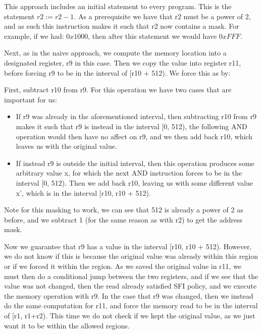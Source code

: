 This approach includes an initial statement to every program. This is the
statement $r2 := r2 - 1$. As a prerequisite we have that r2 must be a power of
2, and as such this instruction makes it such that r2 now contains a mask. For
example, if we had: $0x1000$, then after this statement we would have $0xFFF$.

Next, as in the naive approach, we compute the memory location into a
designated register, r9 in this case. Then we copy the value into register r11,
before forcing r9 to be in the interval of [r10 + 512). We force this as by:

First, subtract r10 from r9. For this operation we have two cases that are
important for us: 
\begin{itemize}
  \item If r9 was already in the aforementioned interval, then subtracting r10
    from r9 makes it such that r9 is instead in the interval [0, 512), the
    following AND operation would then have no affect on r9, and we then add
    back r10, which leaves us with the original value.
  \item If instead r9 is outside the initial interval, then this operation
    produces some arbitrary value x, for which the next AND instruction forces
    to be in the interval [0, 512). Then we add back r10, leaving us with some
    different value x', which is in the interval [r10, r10 + 512).
\end{itemize}

Note for this masking to work, we can see that 512 is already a power of 2 as
before, and we subtract 1 (for the same reason as with r2) to get the address
mask.

Now we guarantee that r9 has a value in the interval [r10, r10 + 512). However,
we do not know if this is because the original value was already within this
region or if we forced it within the region. As we saved the original value in
r11, we must then do a conditional jump between the two registers, and if we
see that the value was not changed, then the read already satisfied SFI policy,
and we execute the memory operation with r9. In the case that r9 was changed,
then we instead do the same computation for r11, and force the memory read to
be in the interval of [r1, r1+r2). This time we do not check if we kept the
original value, as we just want it to be within the allowed regions.
